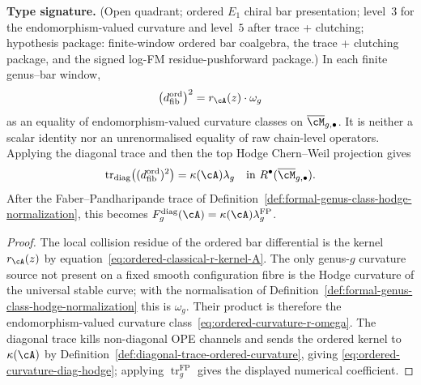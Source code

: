 \begin{proposition}
\label{prop:ordered-curvature-scalar-hodge-projection}
\textbf{Type signature.} (Open quadrant; ordered $E_1$ chiral bar
presentation; level~$3$ for the endomorphism-valued curvature and
level~$5$ after trace + clutching; hypothesis package: finite-window
ordered bar coalgebra, the trace + clutching package, and the signed
log-FM residue-pushforward package.)
In each finite genus--bar window,
\begin{equation}\label{eq:ordered-curvature-r-omega}
\bigl(d_{\mathrm{fib}}^{\mathrm{ord}}\bigr)^2
=
r_\cA(z)\cdot\omega_g
\end{equation}
as an equality of endomorphism-valued curvature classes on
$\overline{\cM}_{g,\bullet}$.  It is neither a scalar identity nor an
unrenormalised equality of raw chain-level operators.  Applying the
diagonal trace and then the top Hodge
Chern--Weil projection gives
\begin{equation}\label{eq:ordered-curvature-diag-hodge}
\operatorname{tr}_{\mathrm{diag}}
\bigl((d_{\mathrm{fib}}^{\mathrm{ord}})^2\bigr)
=
\kappa(\cA)\lambda_g
\quad\text{in }R^\bullet(\overline{\cM}_{g,\bullet}).
\end{equation}
After the Faber--Pandharipande trace of
Definition~\ref{def:formal-genus-class-hodge-normalization}, this becomes
$F_g^{\mathrm{diag}}(\cA)=\kappa(\cA)\lambda_g^{\mathrm{FP}}$.
\end{proposition}

\begin{proof}
The local collision residue of the ordered bar differential is the
kernel $r_\cA(z)$ by
equation~\ref{eq:ordered-classical-r-kernel-A}.  The only genus-$g$
curvature source not present on a fixed smooth configuration fibre is
the Hodge curvature of the universal stable curve; with the
normalisation of
Definition~\ref{def:formal-genus-class-hodge-normalization} this is
$\omega_g$.  Their product is therefore the endomorphism-valued
curvature class~\eqref{eq:ordered-curvature-r-omega}.  The diagonal
trace kills non-diagonal OPE channels and sends the ordered kernel to
$\kappa(\cA)$ by
Definition~\ref{def:diagonal-trace-ordered-curvature}, giving
\eqref{eq:ordered-curvature-diag-hodge}; applying
$\operatorname{tr}^{\mathrm{FP}}_g$ gives the displayed numerical
coefficient.
\end{proof}

